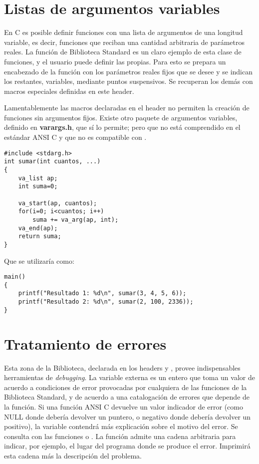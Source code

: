 \section{Listas de argumentos variables}
En C es posible definir funciones con una lista de argumentos de una longitud variable, es decir, 
funciones que reciban una cantidad arbitraria de parámetros reales. La función de Biblioteca 
Standard  es un claro ejemplo de esta clase de funciones, y el usuario puede definir las propias.
Para esto se prepara un encabezado de la función con los parámetros
reales fijos que se desee y se indican los restantes, variables, mediante
puntos suspensivos. Se recuperan los demás con macros especiales definidas en
este header.

Lamentablemente las macros declaradas en el header  no permiten la creación de funciones sin
argumentos fijos. Existe otro paquete de argumentos variables, definido en
\textbf{varargs.h}, que sí lo permite; pero que no está comprendido en el estándar ANSI
C y que no es compatible con .

\begin{ejemplo}
\begin{lstlisting}
#include <stdarg.h>
int sumar(int cuantos, ...)
{
	va_list ap;
	int suma=0;

	va_start(ap, cuantos);
	for(i=0; i<cuantos; i++)
		suma += va_arg(ap, int);
	va_end(ap);
	return suma;
}
\end{lstlisting}
Que se utilizaría como:
\begin{lstlisting}
main()
{
	printf("Resultado 1: %d\n", sumar(3, 4, 5, 6));
	printf("Resultado 2: %d\n", sumar(2, 100, 2336));
}
\end{lstlisting}
\end{ejemplo}

\section{Tratamiento de errores}
Esta zona de la Biblioteca, declarada en los headers  y , provee indispensables herramientas de \textit{debugging}. La
variable externa  es un entero que toma un valor de acuerdo a condiciones
de error provocadas por cualquiera de las funciones de la Biblioteca Standard, y de acuerdo a
una catalogación de errores que depende de la función. Si una función ANSI C
devuelve un valor indicador de error (como NULL donde debería devolver un
puntero, o negativo donde debería devolver un positivo), la variable 
contendrá más explicación sobre el motivo del error. Se consulta con las
funciones  o . La función  admite una cadena
arbitraria para indicar, por ejemplo, el lugar del programa donde se produce el
error. Imprimirá esta cadena más la descripción del problema.

